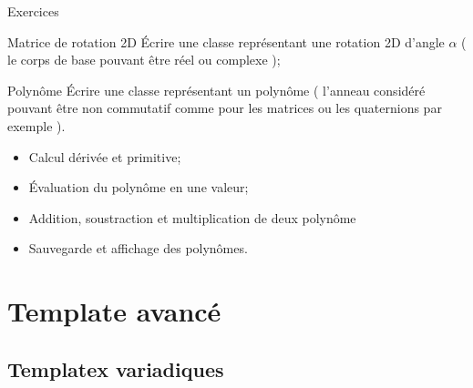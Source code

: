 \documentclass[compress,10pt,aspectratio=169]{beamer}
\begin{document}
  \begin{frame}[fragile]{Exercices}
  \scriptsize
  \begin{exampleblock}{\small Matrice de rotation 2D}
  \'Ecrire une classe représentant une rotation 2D d'angle $\alpha$ ( le corps de 
  base pouvant être réel ou complexe );
  \end{exampleblock}
    
  \begin{exampleblock}{\small Polynôme}
  Écrire une classe représentant un polynôme ( l'anneau considéré pouvant être non 
  commutatif comme pour les matrices ou les quaternions par exemple ).
  \begin{itemize}
    \item Calcul dérivée et primitive;
    \item Évaluation du polynôme en une valeur;
    \item Addition, soustraction et multiplication de deux polynôme
    \item Sauvegarde et affichage des polynômes.
  \end{itemize}
  \end{exampleblock}
  \end{frame}

\section{Template avancé}

\subsection{Templatex variadiques}
\end{document}
